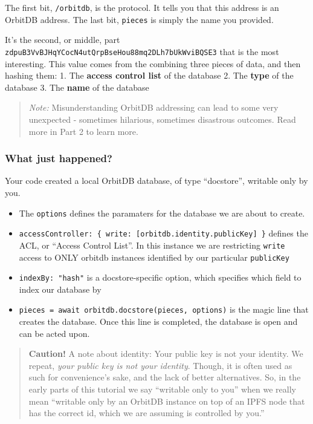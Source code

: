 The first bit, \texttt{/orbitdb}, is the protocol. It tells you that
this address is an OrbitDB address. The last bit, \texttt{pieces} is
simply the name you provided.

It's the second, or middle, part
\texttt{zdpuB3VvBJHqYCocN4utQrpBseHou88mq2DLh7bUkWviBQSE3} that is the
most interesting. This value comes from the combining three pieces of
data, and then hashing them: 1. The \textbf{access control list} of the
database 2. The \textbf{type} of the database 3. The \textbf{name} of
the database

\begin{quote}
\emph{Note:} Misunderstanding OrbitDB addressing can lead to some very
unexpected - sometimes hilarious, sometimes disastrous outcomes. Read
more in Part 2 to learn more.
\end{quote}

\subsubsection{What just happened?}\label{what-just-happened-4}

Your code created a local OrbitDB database, of type ``docstore'',
writable only by you.

\begin{itemize}
\tightlist
\item
  The \texttt{options} defines the paramaters for the database we are
  about to create.
\item
  \texttt{accessController:\ \{\ write:\ {[}orbitdb.identity.publicKey{]}\ \}}
  defines the ACL, or ``Access Control List''. In this instance we are
  restricting \texttt{write} access to ONLY orbitdb instances identified
  by our particular \texttt{publicKey}
\item
  \texttt{indexBy:\ "hash"} is a docstore-specific option, which
  specifies which field to index our database by
\item
  \texttt{pieces\ =\ await\ orbitdb.docstore(\textquotesingle{}pieces\textquotesingle{},\ options)}
  is the magic line that creates the database. Once this line is
  completed, the database is open and can be acted upon.
\end{itemize}

\begin{quote}
\textbf{Caution!} A note about identity: Your public key is not your
identity. We repeat, \emph{your public key is not your identity}.
Though, it is often used as such for convenience's sake, and the lack of
better alternatives. So, in the early parts of this tutorial we say
``writable only to you'' when we really mean ``writable only by an
OrbitDB instance on top of an IPFS node that has the correct id, which
we are assuming is controlled by you.''
\end{quote}

